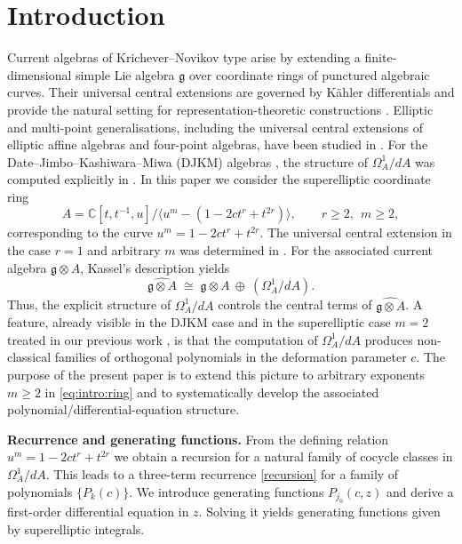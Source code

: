\documentclass[final,nopreprintline]{elsarticle}
\theoremstyle{definition}
\numberwithin{equation}{section}
\theoremstyle{remark}
\newcommand{\Cx}{\mathbb{C}}
\begin{document}
\section*{Introduction}

Current algebras of Krichever--Novikov type \cite{krichever1987algebras,Krichever1988,schlichenmaier2014}
arise by extending a finite-dimensional
simple Lie algebra $\mathfrak{g}$ over coordinate rings of punctured algebraic curves.
Their universal central extensions are governed by K\"{a}hler differentials
\cite{kassel1984kahler,kassel1982extensions}
and provide the natural setting for representation-theoretic constructions
\cite{Kazhdan1991,Kazhdan1994}.
Elliptic and multi-point generalisations, including the universal central extensions of
elliptic affine algebras and four-point algebras, have been studied in
\cite{bremner1994universal,bremner1995four}.
For the Date--Jimbo--Kashiwara--Miwa (DJKM) algebras
\cite{Date1983,Cox2011DJKMExtension,Cox2014Realizations},
the structure of $\Omega^1_A/dA$ was computed explicitly in \cite{Cox2013DJKMPolynomials}.
In this paper we consider the superelliptic coordinate ring
\begin{equation}\label{eq:intro:ring}
A=\Cx[t,t^{-1},u]/\langle u^m-(1-2ct^r+t^{2r})\rangle,
\qquad r\ge2,\ \ m\ge2,
\end{equation}
corresponding to the curve $u^m = 1-2ct^r+t^{2r}$.
The universal central extension in the case $r=1$ and arbitrary $m$ was determined in
\cite{AlbinodosSantos2021OnAlgebras}.
For the associated current algebra $\mathfrak{g}\otimes A$, Kassel's description \cite{kassel1984kahler} yields
\[
\widehat{\mathfrak{g}\otimes A}\;\cong\;\mathfrak{g}\otimes A\ \oplus\ (\Omega^1_A/dA).
\]
Thus, the explicit structure of $\Omega^1_A/dA$ controls the central terms of
$\widehat{\mathfrak{g}\otimes A}$.
A feature, already visible in the DJKM case \cite{Cox2013DJKMPolynomials}
and in the superelliptic case $m=2$ treated in our previous work \cite{SantosNeklyudovFutorny},
is that the computation of $\Omega^1_A/dA$ produces non-classical families of orthogonal
polynomials in the deformation parameter $c$.
The purpose of the present paper is to extend this picture to arbitrary exponents $m\ge2$
in \eqref{eq:intro:ring} and to systematically develop the associated
polynomial/differential-equation structure.

\medskip
\noindent\textbf{Recurrence and generating functions.}
From the defining relation $u^m=1-2ct^r+t^{2r}$ we obtain a recursion for a natural
family of cocycle classes in $\Omega^1_A/dA$. This leads to a three-term recurrence
\eqref{recursion} for a family of polynomials $\{P_k(c)\}$.
We introduce generating functions $P_{j_0}(c,z)$ and derive a
first-order differential equation in $z$. Solving it yields generating functions
given by superelliptic integrals.
\end{document}
